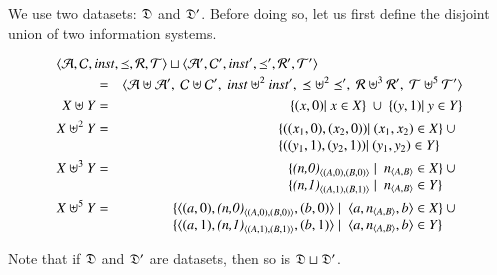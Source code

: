 \documentclass{elsarticle}
\begin{document}
	We use two datasets: $\mathfrak{D}$ and $\mathfrak{D}'$.
	Before doing so, let us first define the disjoint union of two information systems.
\begin{definition}
\begin{eqnarray}
	\omit\rlap{$\la\atoms,\concepts,\inst,\isa,\rels,\triples\ra\sqcup\la\atoms',\concepts',\inst',\isa',\rels',\triples'\ra$}\notag\\
	&=&\la\atoms\uplus\atoms',\ \concepts\uplus\concepts',\ \inst\uplus^2\inst',\ \isa\uplus^2\isa',\ \rels\uplus^3\rels',\ \triples\uplus^5\triples'\ra\notag\\
		X\uplus Y&=&\{(x,0)|\ x\in X\}\ \cup\ \{(y,1)|\ y\in Y\}\\
		X\uplus^2 Y&=&\begin{array}[t]{@{}l}\{((x_1,0),(x_2,0))|\ (x_1,x_2)\in X\}\ \cup\\ \{((y_1,1),(y_2,1))|\ (y_1,y_2)\in Y\}\end{array}\\
		X\uplus^3 Y&=&\begin{array}[t]{@{}l}\{\declare{(n,0)}{(A,0)}{(B,0)}\mid\ \declare{n}{A}{B}\in X\}\ \cup\\ \{\declare{(n,1)}{(A,1)}{(B,1)}\mid\ \declare{n}{A}{B}\in Y\}\end{array}\\
		X\uplus^5 Y&=&\begin{array}[t]{@{}l}\{\triple{(a,0)}{\declare{(n,0)}{(A,0)}{(B,0)}}{(b,0)}\mid\ \triple{a}{\declare{n}{A}{B}}{b}\in X\}\ \cup\\ \{\triple{(a,1)}{\declare{(n,1)}{(A,1)}{(B,1)}}{(b,1)}\mid\ \triple{a}{\declare{n}{A}{B}}{b}\in Y\}\end{array}
\end{eqnarray}
\end{definition}
Note that if $\mathfrak{D}$ and $\mathfrak{D}'$ are datasets, then so is $\mathfrak{D}\sqcup\mathfrak{D}'$.
\end{document}
